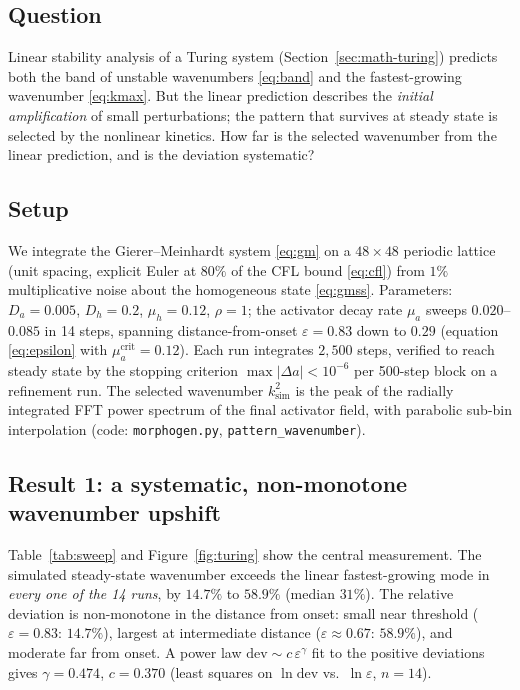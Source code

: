 \label{sec:studyA}

\subsection{Question}

Linear stability analysis of a Turing system (Section~\ref{sec:math-turing})
predicts both the band of unstable wavenumbers \eqref{eq:band} and the
fastest-growing wavenumber \eqref{eq:kmax}. But the linear prediction
describes the \emph{initial amplification} of small perturbations; the pattern
that survives at steady state is selected by the nonlinear kinetics. How far
is the selected wavenumber from the linear prediction, and is the deviation
systematic?

\subsection{Setup}

We integrate the Gierer--Meinhardt system \eqref{eq:gm} on a $48 \times 48$
periodic lattice (unit spacing, explicit Euler at $80\%$ of the CFL bound
\eqref{eq:cfl}) from $1\%$ multiplicative noise about the homogeneous state
\eqref{eq:gmss}. Parameters: $D_a = 0.005$, $D_h = 0.2$, $\mu_h = 0.12$,
$\rho = 1$; the activator decay rate $\mu_a$ sweeps $0.020$--$0.085$ in 14
steps, spanning distance-from-onset $\varepsilon = 0.83$ down to $0.29$
(equation \eqref{eq:epsilon} with $\mu_a^{\mathrm{crit}} = 0.12$). Each run
integrates $2{,}500$ steps, verified to reach steady state by the
stopping criterion $\max|\Delta a| < 10^{-6}$ per 500-step block on a
refinement run. The selected wavenumber $k^2_{\mathrm{sim}}$ is the peak of
the radially integrated FFT power spectrum of the final activator field, with
parabolic sub-bin interpolation (code: \texttt{morphogen.py},
\texttt{pattern\_wavenumber}).

\subsection{Result 1: a systematic, non-monotone wavenumber upshift}
\label{sec:upshift}

Table~\ref{tab:sweep} and Figure~\ref{fig:turing} show the central
measurement. The simulated steady-state wavenumber exceeds the linear
fastest-growing mode in \emph{every one of the 14 runs}, by $14.7\%$ to
$58.9\%$ (median $31\%$). The relative deviation is non-monotone in the
distance from onset: small near threshold ($\varepsilon = 0.83$: $14.7\%$),
largest at intermediate distance ($\varepsilon \approx 0.67$: $58.9\%$), and
moderate far from onset. A power law $\mathrm{dev} \sim c\, \varepsilon^\gamma$
fit to the positive deviations gives $\gamma = 0.474$, $c = 0.370$
(least squares on $\ln \mathrm{dev}$ vs.\ $\ln \varepsilon$, $n = 14$).

